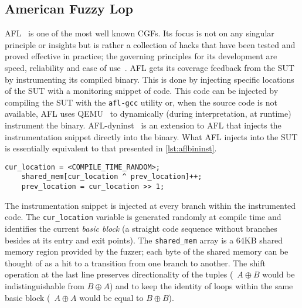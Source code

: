 \subsection{American Fuzzy Lop}
AFL~\cite{afl} is one of the most well known \acp{CGF}. Its focus is not on any
singular principle or insights but is rather a collection of hacks that have
been tested and proved effective in practice; the governing principles for its
development are speed, reliability and ease of use~\cite{afltech}. AFL gets its
coverage feedback from the \ac{SUT} by instrumenting its compiled binary. This
is done by injecting specific locations of the \ac{SUT} with a monitoring
snippet of code. This code can be injected by compiling the \ac{SUT} with the
\texttt{afl-gcc} utility or, when the source code is not available, AFL uses
QEMU~\cite{bellard2005qemu} to dynamically (during interpretation, at runtime)
instrument the binary. AFL-dyninst~\cite{afldyn} is an extension to AFL that
injects the instrumentation snippet directly into the binary. What AFL injects
into the \ac{SUT} is essentially equivalent to that presented in
\autoref{lst:aflbininst}.

\begin{lstlisting}[caption={AFL's instrumentation},label=lst:aflbininst,float]
    cur_location = <COMPILE_TIME_RANDOM>;
    shared_mem[cur_location ^ prev_location]++;
    prev_location = cur_location >> 1;
\end{lstlisting}

The instrumentation snippet is injected at every branch within the instrumented
code. The \texttt{cur\_location} variable is generated randomly at compile time
and identifies the current \emph{basic block} (a straight code sequence without
branches besides at its entry and exit points). The \texttt{shared\_mem} array
is a 64KB shared memory region provided by the fuzzer; each byte of the shared
memory can be thought of as a hit to a transition from one branch to another.
The shift operation at the last line preserves directionality of the tuples
(\eg~$A \oplus B$ would be indistinguishable from $B \oplus A$) and to keep the
identity of loops within the same basic block (\eg~$A \oplus A$ would be equal
to $B \oplus B$).

